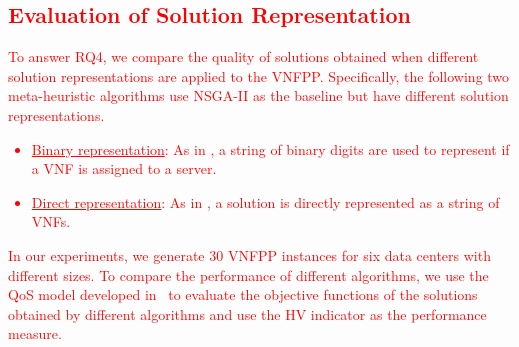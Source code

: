 \vspace{0.5em}
\noindent
{}
\textcolor{red}{
\subsection{Evaluation of Solution Representation}
\label{sec:alternative_representations}
}
\textcolor{red}{To answer RQ4, we compare the quality of solutions obtained when different solution representations are applied to the VNFPP. Specifically, the following two meta-heuristic algorithms use NSGA-II as the baseline but have different solution representations.
\begin{itemize}
    \item\underline{Binary representation}: As in \cite{ChantreF20,KaurGK020,CharismiadisTPM20}, a string of binary digits are used to represent if a VNF is assigned to a server.
    \item\underline{Direct representation}: As in \cite{RankothgeLRL17}, a solution is directly represented as a string of VNFs.
\end{itemize}
In our experiments, we generate $30$ VNFPP instances for six data centers with different sizes. To compare the performance of different algorithms, we use the QoS model developed in~ to evaluate the objective functions of the solutions obtained by different algorithms and use the HV indicator as the performance measure.}

